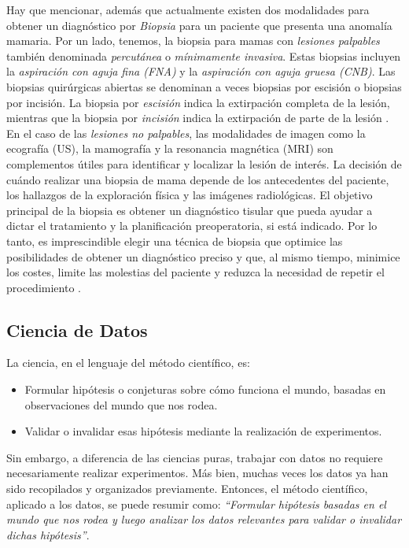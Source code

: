 Hay que mencionar, además que actualmente existen dos modalidades para obtener un diagnóstico por \textit{Biopsia} para un paciente que presenta una anomalía mamaria. Por un lado, tenemos, la biopsia para mamas con \textit{lesiones palpables} también denominada \textit{percutánea} o \textit{mínimamente invasiva}. Estas biopsias incluyen la \textit{aspiración con aguja fina (FNA)} y la \textit{aspiración con aguja gruesa (CNB)}. Las biopsias quirúrgicas abiertas se denominan a veces biopsias por escisión o biopsias por incisión. La biopsia por \textit {escisión} indica la extirpación completa de la lesión, mientras que la biopsia por \textit {incisión} indica la extirpación de parte de la lesión \cite{Greenfield2012}. En el caso de las \textit{lesiones no palpables}, las modalidades de imagen como la ecografía (US), la mamografía y la resonancia magnética (MRI) son complementos útiles para identificar y localizar la lesión de interés. La decisión de cuándo realizar una biopsia de mama depende de los antecedentes del paciente, los hallazgos de la exploración física y las imágenes radiológicas. El objetivo principal de la biopsia es obtener un diagnóstico tisular que pueda ayudar a dictar el tratamiento y la planificación preoperatoria, si está indicado. Por lo tanto, es imprescindible elegir una técnica de biopsia que optimice las posibilidades de obtener un diagnóstico preciso y que, al mismo tiempo, minimice los costes, limite las molestias del paciente y reduzca la necesidad de repetir el procedimiento \cite{Samilia2018}.

\newpage
\subsection{Ciencia de Datos}
La ciencia, en el lenguaje del método científico, es:
\begin{itemize}
	\item Formular hipótesis o conjeturas sobre cómo funciona el mundo, basadas en observaciones del mundo que nos rodea.
	\item Validar o invalidar esas hipótesis mediante la realización de experimentos.
\end{itemize}                   
Sin embargo, a diferencia de las ciencias puras, trabajar con datos no requiere necesariamente realizar experimentos. Más bien, muchas veces los datos ya han sido recopilados y organizados previamente. Entonces, el método científico, aplicado a los datos, se puede resumir como: \textit{“Formular hipótesis basadas en el mundo que nos rodea y luego analizar los datos relevantes para validar o invalidar dichas hipótesis”}. 

